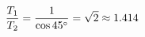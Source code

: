 \documentclass[preview]{standalone}
\begin{document}
\begin{align*}
\special{dvisvgm:raw <g id='unique000'>}\frac{T_1}{T_2} = \frac{1}{\cos 45^\circ} = \sqrt{2} \approx 1.414\special{dvisvgm:raw </g>}
\end{align*}
\end{document}
